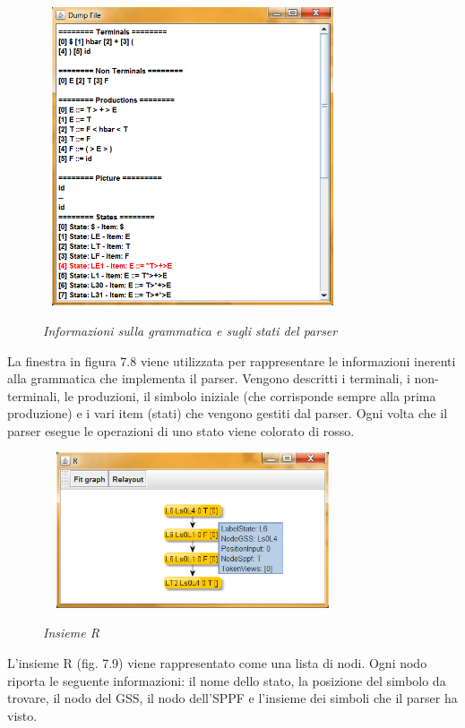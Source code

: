\begin{figure}[hbpb]\label{DumpFile}
	\centering
	{\includegraphics[height=250pt,width=250pt,scale=0.1]{files/DumpFile.png}}
	\caption{\textit{Informazioni sulla grammatica e sugli stati del parser}}
\end{figure}
\noindent La finestra in figura 7.8 viene utilizzata per rappresentare le informazioni inerenti alla grammatica che implementa il parser. Vengono descritti i terminali, i non-terminali, le produzioni, il simbolo iniziale (che corrisponde sempre alla prima produzione) e i vari item (stati) che vengono gestiti dal parser. Ogni volta che il parser esegue le operazioni di uno stato viene colorato di rosso.\par 
\begin{figure}[hbpb]\label{InsiemeR}
	\centering
	{\includegraphics[height=130pt,width=250pt,scale=0.1]{files/InsiemeR.png}}
	\caption{\textit{Insieme R}}
\end{figure}
\noindent L'insieme R (fig. 7.9) viene rappresentato come una lista di nodi. Ogni nodo riporta le seguente informazioni: il nome dello stato, la posizione del simbolo da trovare, il nodo del GSS, il nodo dell'SPPF e l'insieme dei simboli che il parser ha visto.

